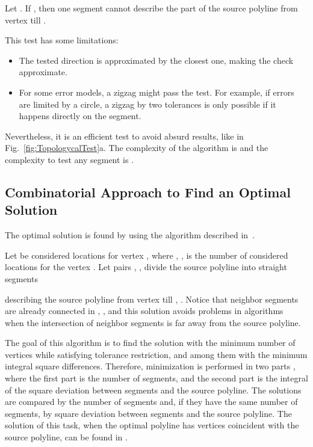 \documentclass[conference]{IEEEtran}
\begin{document}
Let . If , then one segment cannot describe the part of the source polyline from vertex  till .

This test has some limitations:
\begin{itemize}
  \item The tested direction is approximated by the closest one, making the check approximate.
  \item For some error models, a zigzag might pass the test. For example, if errors are limited by a circle, a zigzag by two tolerances is only possible if it happens directly on the segment.
\end{itemize}

Nevertheless, it is an efficient test to avoid absurd results, like in Fig.~\ref{fig:TopologycalTest}a. The complexity of the algorithm is  and the complexity to test any segment is .

\subsection
{
  Combinatorial Approach to Find an Optimal Solution
  \label{sec:CombinatorialApproach}
}

The optimal solution is found by using the algorithm described in~\cite{PolylineGeneralizationCombinatorical}.

Let  be considered locations for vertex , where , ,  is the number of considered locations for the vertex . Let pairs , , divide the source polyline into  straight segments

describing the source polyline from vertex  till , . Notice that neighbor segments are already connected in , , and this solution avoids problems in algorithms~\cite{PolylineGeneralizationCombinatorical, PolylineGeneralization} when the intersection of neighbor segments is far away from the source polyline.

The goal of this algorithm is to find the solution with the minimum number of vertices while satisfying tolerance restriction, and among them with the minimum integral square differences. Therefore, minimization is performed in two parts
,
where the first part  is the number of segments, and the second part  is the integral of the square deviation between segments and the source polyline. The solutions are compared by the number of segments and, if they have the same number of segments, by square deviation between segments and the source polyline. The solution of this task, when the optimal polyline has vertices coincident with the source polyline, can be found in \cite{CombinatorialMinimumNumberSegments}.
\end{document}
